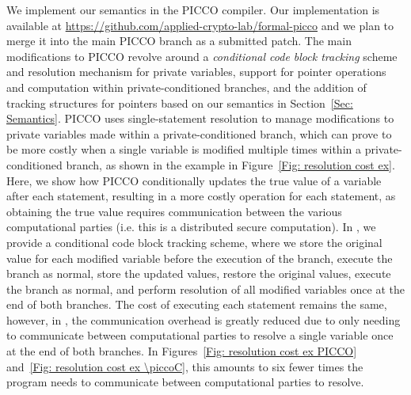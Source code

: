 
We implement our semantics in the PICCO compiler.
Our implementation is available at \url{https://github.com/applied-crypto-lab/formal-picco} and we plan to merge it into the main PICCO branch as a submitted patch. 
The main modifications to PICCO revolve around a {\em conditional code block tracking} scheme and resolution mechanism for private variables, support for pointer operations and computation within private-conditioned branches, and the addition of tracking structures for pointers based on our semantics in Section~\ref{Sec: Semantics}.
PICCO uses single-statement resolution to manage modifications to private variables made within a private-conditioned branch, which can prove to be more costly when a single variable is modified multiple times within a private-conditioned branch, as shown in the example in Figure~\ref{Fig: resolution cost ex}. 
Here, we show how PICCO conditionally updates the true value of a variable after each statement, resulting in a more costly operation for each statement, as obtaining the true value requires communication between the various computational parties (i.e. this is a distributed secure computation). 
In \piccoC, we provide a conditional code block tracking scheme, where we store the original value for each modified variable before the execution of the  branch, execute the  branch as normal, store the updated values, restore the original values, execute the  branch as normal, and perform resolution of all modified variables once at the end of both branches.
The cost of executing each statement remains the same, however, in \piccoC, the communication overhead is greatly reduced due to only needing to communicate between computational parties to resolve a single variable once at the end of both branches. 
In Figures~\ref{Fig: resolution cost ex PICCO} and~\ref{Fig: resolution cost ex \piccoC}, this amounts to six fewer times the program needs to communicate between computational parties to resolve. 


